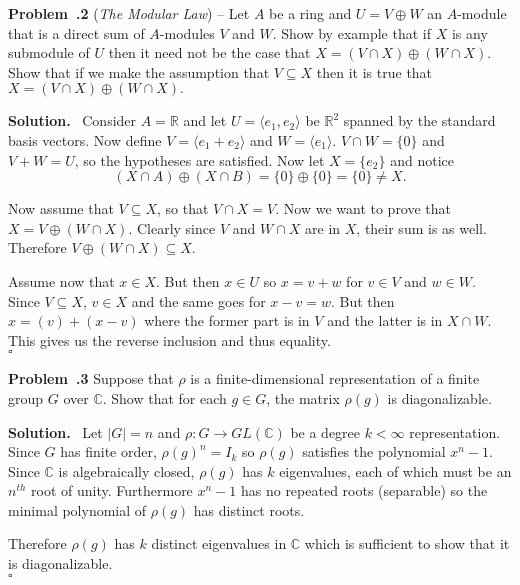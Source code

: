 \documentclass[12pt]{article}
\newcommand*{\R}{
\mathbb{R}
}
\newcommand*{\C}{
\mathbb{C}
}
\newenvironment{prob}[1]{\par\smallskip
	\noindent\begin{mdframed}\small \textbf{Problem~\thesection.#1} \rmfamily\quad}{\end{mdframed}\medskip}
\newenvironment{sol}{\noindent \textbf{Solution.} \,}{\\\hspace*{\fill}$\square$\medskip}
\begin{document}
\begin{prob}{2}
	(\textit{The Modular Law}) -- Let $A$ be a ring and $U=V\oplus W$ an $A$-module that is a direct sum of $A$-modules $V$ and $W$. Show by example that if $X$ is any submodule of $U$ then it need not be the case that $X=(V\cap X)\oplus(W\cap X)$. Show that if we make the assumption that $V\subseteq X$ then it is true that $X=(V\cap X)\oplus (W\cap X).$
\end{prob}
\begin{sol}
	Consider $A=\R$ and let $U=\langle e_1,e_2\rangle$ be $\R^2$ spanned by the standard basis vectors. Now define $V=\langle e_1+e_2\rangle$ and $W=\langle e_1\rangle$. $V\cap W=\{0\}$ and $V+W=U$, so the hypotheses are satisfied. Now let $X=\{e_2\}$ and notice
	\[(X\cap A)\oplus (X\cap B)=\{0\}\oplus\{0\}=\{0\}\ne X.\]
	
	Now assume that $V\subseteq X$, so that $V\cap X=V.$ Now we want to prove that $X=V\oplus(W\cap X).$ Clearly since $V$ and $W\cap X$ are in $X$, their sum is as well. Therefore $V\oplus (W\cap X)\subseteq X.$ 
	
	Assume now that $x\in X$. But then $x\in U$ so $x=v+w$ for $v\in V$ and $w\in W$. Since $V\subseteq X$, $v\in X$ and the same goes for $x-v=w$. But then $x=(v)+(x-v)$ where the former part is in $V$ and the latter is in $X\cap W$. This gives us the reverse inclusion and thus equality.
\end{sol}

\begin{prob}{3}
	Suppose that $\rho$ is a finite-dimensional representation of a finite group $G$ over $\C$. Show that for each $g\in G$, the matrix $\rho(g)$ is diagonalizable.
\end{prob}
\begin{sol}
	Let $|G|=n$ and $\rho:G\to GL(\C)$ be a degree $k<\infty$ representation. Since $G$ has finite order, $\rho(g)^n=I_k$ so $\rho(g)$ satisfies the polynomial $x^n-1$. Since $\C$ is algebraically closed, $\rho(g)$ has $k$ eigenvalues, each of which must be an $n^{th}$ root of unity. Furthermore $x^n-1$ has no repeated roots (separable) so the minimal polynomial of $\rho(g)$ has distinct roots.
	
	Therefore $\rho(g)$ has $k$ distinct eigenvalues in $\C$ which is sufficient to show that it is diagonalizable.
\end{sol}
\end{document}
